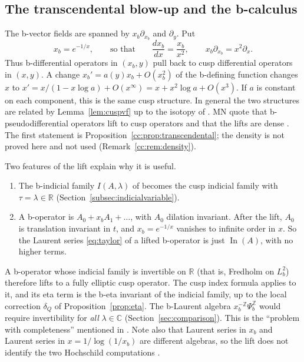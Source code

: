 \documentclass[11pt,oneside,reqno]{article}
\DeclareMathOperator{\In}{In}
\newcommand{\C}{\mathbb C}
\newcommand{\R}{\mathbb R}
\newcommand{\Z}{\mathbb Z}
\theoremstyle{plain}
\theoremstyle{definition}
\theoremstyle{remark}
\begin{document}
\subsection{The transcendental blow-up and the b-calculus}
\label{subsec:transcendental}
The b-vector fields are spanned by \(x_b\partial_{x_b}\) and
\(\partial_y\). Put \cite[(143)]{MN}
\[
 x_b=e^{-1/x},\qquad\text{so that}\qquad
 \frac{dx_b}{dx}=\frac{x_b}{x^2},\qquad
 x_b\partial_{x_b}=x^2\partial_x .
\]
Thus b-differential operators in \((x_b,y)\) pull back to cusp
differential operators in \((x,y)\). A change \(x_b'=a(y)x_b+O(x_b^2)\)
of the b-defining function changes \(x\) to
\(x'=x/(1-x\log a)+O(x^\infty)=x+x^2\log a+O(x^3)\). If \(a\) is constant
on each component, this is the same cusp structure. In general the two
structures are related by Lemma~\ref{lem:cuspvf} up to the isotopy of
\cite[Lemma~19]{MN}. MN quote that b-pseudodifferential operators lift
to cusp operators and that the lifts are dense \cite[Prop.~26]{MN}. The
first statement is Proposition~\ref{cc:prop:transcendental}; the density
is not proved here and not used (Remark~\ref{cc:rem:density}).

Two features of the lift explain why it is useful.
\begin{enumerate}
\item The b-indicial family \(I(A,\lambda)\) of \cite{Notes} becomes
the cusp indicial family with \(\tau=\lambda\in\R\)
(Section~\ref{subsec:indicialvariable}).
\item A b-operator is \(A_0+x_bA_1+\dots\), with \(A_0\) dilation
invariant. After the lift, \(A_0\) is translation invariant in \(t\), and
\(x_b=e^{-1/x}\) vanishes to infinite order in \(x\). So the Laurent
series \eqref{eq:taylor} of a lifted b-operator is just \(\In(A)\), with
no higher terms.
\end{enumerate}
A b-operator whose indicial family is invertible on \(\R\) (that is, Fredholm
on \(L^2_b\)) therefore lifts to a fully elliptic cusp operator. The cusp
index formula applies to it, and its eta term is the b-eta invariant of
the indicial family, up to the local correction \(\delta_Q\) of
Proposition~\ref{prop:eta}. The b-Laurent algebra \(x_b^{-\Z}\Psi_b^{\Z}\) would
require invertibility for \emph{all} \(\lambda\in\C\)
(Section~\ref{sec:comparison}). This is the ``problem with completeness''
mentioned in \cite[p.~3]{MN}. Note also that Laurent series in \(x_b\) and
Laurent series in \(x=1/\log(1/x_b)\) are different algebras, so the lift
does not identify the two Hochschild computations \cite{HHb}.
\end{document}
